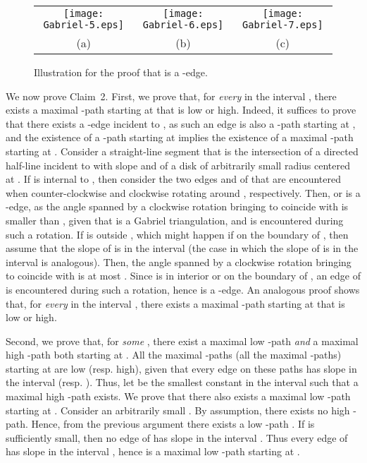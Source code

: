 \documentclass{llncs}
\renewenvironment{proof}
{{\bf Proof:}}{\hspace*{\fill}\par\vspace{2mm}}
\begin{document}
\begin{proof}
\begin{figure}[tb]
\begin{center}
\begin{tabular}{c c c}
\mbox{\texttt{[image: Gabriel-5.eps]}} & \hspace{5mm}
\mbox{\texttt{[image: Gabriel-6.eps]}} & \hspace{5mm}
\mbox{\texttt{[image: Gabriel-7.eps]}}\\
(a) \hspace{5mm} & \hspace{5mm} (b) & \hspace{5mm} (c)
\end{tabular}
\caption{Illustration for the proof that  is a -edge.}
\label{fig:gabriel-2}
\end{center}
\end{figure}



We now prove Claim~2.  First, we prove that, for {\em every}  in the interval , there exists a maximal -path starting at  that is low or high. Indeed, it suffices to prove that there exists a -edge incident to , as such an edge is also a -path starting at , and the existence of a -path starting at  implies the existence of a maximal -path starting at . Consider a straight-line segment  that is the intersection of a directed half-line incident to  with slope  and of a disk of arbitrarily small radius centered at . If  is internal to , then consider the two edges  and  of  that are encountered when counter-clockwise and clockwise rotating  around , respectively. Then,  or  is a -edge, as the angle spanned by a clockwise rotation bringing  to coincide with  is smaller than , given that  is a Gabriel triangulation, and  is encountered during such a rotation. If  is outside , which might happen if  on the boundary of , then assume that the slope of  is in the interval  (the case in which the slope of  is in the interval  is analogous). Then, the angle spanned by a clockwise rotation bringing  to coincide with  is  at most . Since  is in interior or on the boundary of , an edge  of  is encountered during such a rotation, hence  is a -edge. An analogous proof shows that, for {\em every}  in the interval , there exists a maximal -path starting at  that is low or high.

Second, we prove that, for {\em some} , there exist a maximal low -path {\em and} a maximal high -path both starting at . All the maximal -paths (all the maximal -paths) starting at  are low (resp. high), given that every edge on these paths has slope in the interval  (resp. ). Thus, let  be the smallest constant in the interval  such that a maximal high -path exists. We prove that there also exists a maximal low -path starting at . Consider an arbitrarily small . By assumption, there exists no high -path. Hence, from the previous argument there exists a low -path . If  is sufficiently small, then no edge of  has slope in the interval . Thus every edge of  has slope in the interval , hence  is a maximal low -path starting at .


\end{proof}
\end{document}
